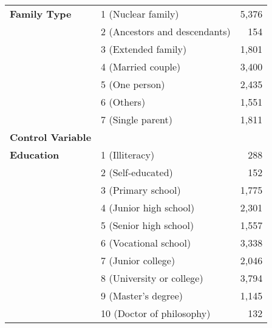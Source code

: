 \begin{landscape}
\begin{table}[]
{\begin{tabular}{@{}llr@{}}
    \textbf{Family Type}           & 1 (Nuclear family)            & 5,376              \\
                                   & 2 (Ancestors and descendants) & 154                \\
                                   & 3 (Extended family)           & 1,801              \\
                                   & 4 (Married couple)            & 3,400              \\
                                   & 5 (One person)                & 2,435              \\
                                   & 6 (Others)                    & 1,551              \\
                                   & 7 (Single parent)             & 1,811              \\ \midrule
    \textbf{Control Variable}      &                               &                    \\
    \textbf{Education}             & 1 (Illiteracy)                & 288                \\
                                   & 2 (Self-educated)             & 152                \\
                                   & 3 (Primary school)            & 1,775              \\
                                   & 4 (Junior high school)        & 2,301              \\
                                   & 5 (Senior high school)        & 1,557              \\
                                   & 6 (Vocational school)         & 3,338              \\
                                   & 7 (Junior college)            & 2,046              \\
                                   & 8 (University or college)     & 3,794              \\
                                   & 9 (Master's degree)           & 1,145              \\
                                   & 10 (Doctor of philosophy)     & 132                \\ \bottomrule
    \end{tabular}%
    }
    \end{table}
    \end{landscape}
